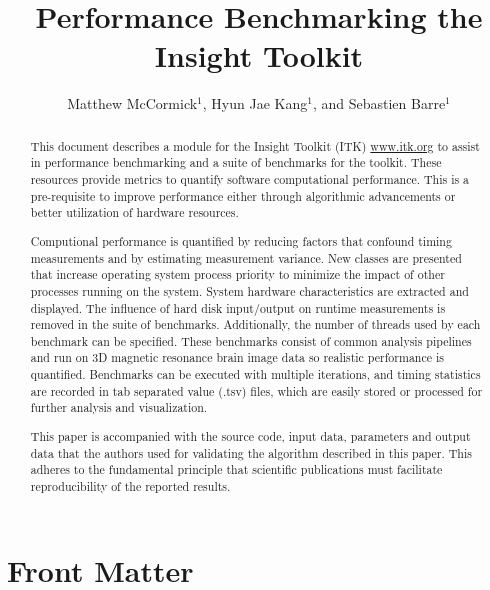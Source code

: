 \documentclass{InsightArticle}
\title{Performance Benchmarking the Insight Toolkit}
\author{Matthew McCormick$^{1}$, Hyun Jae Kang$^{1}$, and Sebastien Barre$^{1}$}
\newcommand{\IJhandlerIDnumber}{1338}
\begin{document}
%
%
\IJhandlefooter{\IJhandlerIDnumber}


\ifpdf
\else
\fi


\maketitle


\ifhtml
\chapter*{Front Matter\label{front}}
\fi

\begin{abstract} \noindent This document describes a module for the Insight
Toolkit (ITK) \url{www.itk.org} to assist in performance benchmarking and a
suite of benchmarks for the toolkit. These resources provide metrics to
quantify software computational performance. This is a pre-requisite to
improve performance either through algorithmic advancements or better
utilization of hardware resources.

Computional performance is quantified by reducing factors that confound timing
measurements and by estimating measurement variance. New classes are presented
that increase operating system process priority to minimize the impact of
other processes running on the system. System hardware characteristics are
extracted and displayed. The influence of hard disk input/output on runtime
measurements is removed in the suite of benchmarks. Additionally, the number
of threads used by each benchmark can be specified. These benchmarks consist
of common analysis pipelines and run on 3D magnetic resonance brain image data
so realistic performance is quantified. Benchmarks can be executed with
multiple iterations, and timing statistics are recorded in tab separated value
(.tsv) files, which are easily stored or processed for further analysis and
visualization.

This paper is accompanied with the source code, input data, parameters and
output data that the authors used for validating the algorithm described in
this paper. This adheres to the fundamental principle that scientific
publications must facilitate reproducibility of the reported results.

\end{abstract}
\end{document}
